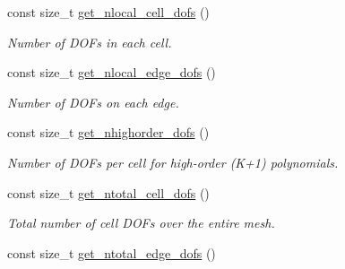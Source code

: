 \begin{DoxyCompactItemize}
\mbox{\label{classHArDCore2D_1_1HHO__LocVarDiff_a4f40caa5b5d827f078f32fdfa888ed4e}} 
const size\+\_\+t \hyperlink{classHArDCore2D_1_1HHO__LocVarDiff_a4f40caa5b5d827f078f32fdfa888ed4e}{get\+\_\+nlocal\+\_\+cell\+\_\+dofs} ()
\begin{DoxyCompactList}\small\item\em Number of D\+O\+Fs in each cell. \end{DoxyCompactList}\item 
\mbox{\label{classHArDCore2D_1_1HHO__LocVarDiff_ab6713bb636cc108b62d04e0c87a4fdf8}} 
const size\+\_\+t \hyperlink{classHArDCore2D_1_1HHO__LocVarDiff_ab6713bb636cc108b62d04e0c87a4fdf8}{get\+\_\+nlocal\+\_\+edge\+\_\+dofs} ()
\begin{DoxyCompactList}\small\item\em Number of D\+O\+Fs on each edge. \end{DoxyCompactList}\item 
\mbox{\label{classHArDCore2D_1_1HHO__LocVarDiff_a1f76dc1a9a6c0b6ccfac42b33073480c}} 
const size\+\_\+t \hyperlink{classHArDCore2D_1_1HHO__LocVarDiff_a1f76dc1a9a6c0b6ccfac42b33073480c}{get\+\_\+nhighorder\+\_\+dofs} ()
\begin{DoxyCompactList}\small\item\em Number of D\+O\+Fs per cell for high-\/order (K+1) polynomials. \end{DoxyCompactList}\item 
\mbox{\label{classHArDCore2D_1_1HHO__LocVarDiff_abbda77d7148aac2bf61c43ec766add33}} 
const size\+\_\+t \hyperlink{classHArDCore2D_1_1HHO__LocVarDiff_abbda77d7148aac2bf61c43ec766add33}{get\+\_\+ntotal\+\_\+cell\+\_\+dofs} ()
\begin{DoxyCompactList}\small\item\em Total number of cell D\+O\+Fs over the entire mesh. \end{DoxyCompactList}\item 
\mbox{\label{classHArDCore2D_1_1HHO__LocVarDiff_ad02a8f10049abe8b2c740a60e903f8d0}} 
const size\+\_\+t \hyperlink{classHArDCore2D_1_1HHO__LocVarDiff_ad02a8f10049abe8b2c740a60e903f8d0}{get\+\_\+ntotal\+\_\+edge\+\_\+dofs} ()

\end{DoxyCompactItemize}
